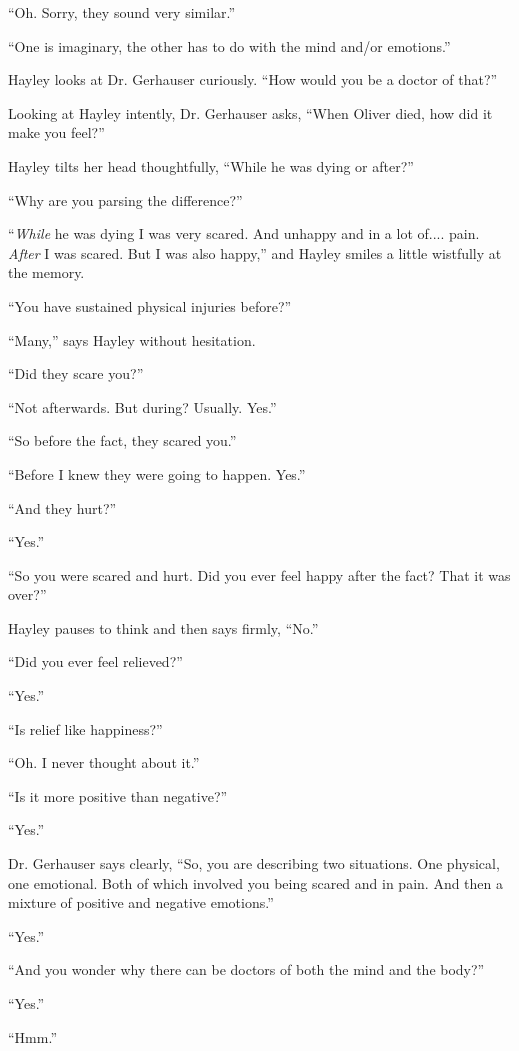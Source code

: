 ``Oh. Sorry, they sound very similar.''

``One is imaginary, the other has to do with the mind and/or emotions.''

Hayley looks at Dr. Gerhauser curiously. ``How would you be a doctor of that?''

Looking at Hayley intently, Dr. Gerhauser asks, ``When Oliver died, how did it make you feel?''

Hayley tilts her head thoughtfully, ``While he was dying or after?''

``Why are you parsing the difference?''

``\textit{While} he was dying I was very scared.  And unhappy and in a lot of.... pain.  \textit{After} I was scared. But I was also happy,'' and Hayley smiles a little wistfully at the memory.

``You have sustained physical injuries before?''

``Many,'' says Hayley without hesitation.

``Did they scare you?''

``Not afterwards. But during?  Usually.  Yes.''

``So before the fact, they scared you.''

``Before I knew they were going to happen. Yes.''

``And they hurt?''

``Yes.''

``So you were scared and hurt.  Did you ever feel happy after the fact?  That it was over?''

Hayley pauses to think and then says firmly, ``No.''

``Did you ever feel relieved?''

``Yes.''

``Is relief like happiness?''

``Oh.  I never thought about it.''

``Is it more positive than negative?''

``Yes.''

Dr. Gerhauser says clearly, ``So, you are describing two situations.  One physical, one emotional. Both of which involved you being scared and in pain.  And then a mixture of positive and negative emotions.''

``Yes.''

``And you wonder why there can be doctors of both the mind and the body?''

``Yes.''

``Hmm.''

